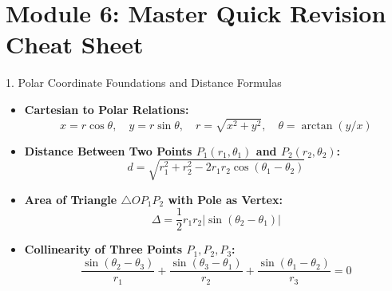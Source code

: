 \documentclass[11pt,a4paper]{article}
\begin{document}
\newpage

\section{Module 6: Master Quick Revision Cheat Sheet}

\begin{formulabox}{1. Polar Coordinate Foundations and Distance Formulas}
\begin{itemize}
    \item \textbf{Cartesian to Polar Relations:}
    \begin{equation*}
        x = r\cos\theta, \quad y = r\sin\theta, \quad r = \sqrt{x^2 + y^2}, \quad \theta = \arctan(y/x)
    \end{equation*}
    \item \textbf{Distance Between Two Points $P_1(r_1, \theta_1)$ and $P_2(r_2, \theta_2)$:}
    \begin{equation*}
        d = \sqrt{r_1^2 + r_2^2 - 2r_1r_2\cos(\theta_1 - \theta_2)}
    \end{equation*}
    \item \textbf{Area of Triangle $\triangle OP_1P_2$ with Pole as Vertex:}
    \begin{equation*}
        \Delta = \frac{1}{2} r_1 r_2 |\sin(\theta_2 - \theta_1)|
    \end{equation*}
    \item \textbf{Collinearity of Three Points $P_1, P_2, P_3$:}
    \begin{equation*}
        \frac{\sin(\theta_2 - \theta_3)}{r_1} + \frac{\sin(\theta_3 - \theta_1)}{r_2} + \frac{\sin(\theta_1 - \theta_2)}{r_3} = 0
    \end{equation*}
\end{itemize}
\end{formulabox}

\vspace{0.2cm}
\end{document}
